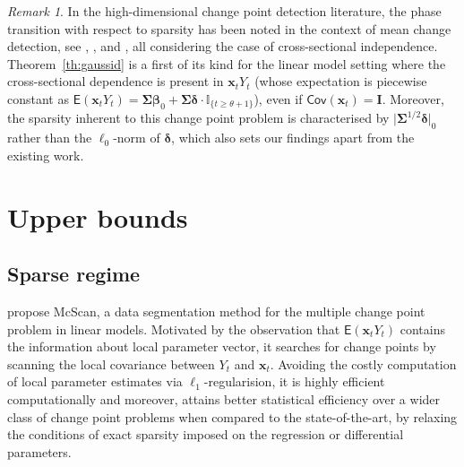 \documentclass[11pt, a4paper]{article}
\newcommand{\mbf}{\mathbf}
\newcommand{\cp}{\theta}
\newcommand{\E}[0]{\mathsf{E}}
\newcommand{\Cov}[0]{\mathsf{Cov}}
\theoremstyle{definition}
\theoremstyle{definition}
\theoremstyle{definition}
\theoremstyle{definition}
\theoremstyle{definition}
\theoremstyle{remark}
\newtheorem{rem}{Remark}[section]
\theoremstyle{definition}
\theoremstyle{definition}
\theoremstyle{definition}
\begin{document}
\begin{rem} %
In the high-dimensional change point detection literature, the phase transition with respect to sparsity has been noted in the context of mean change detection, see \cite{enikeeva2019high}, \cite{liu2021minimax}, \cite{pilliat2023optimal} and \cite{kovacs2024optimistic}, all considering the case of cross-sectional independence.
Theorem~\ref{th:gaussid} is a first of its kind for the linear model setting where the cross-sectional dependence is present in $\mbf x_t Y_t$ (whose expectation is piecewise constant as $\E(\mbf x_t Y_t) = \bm\Sigma \bm\beta_0 + \bm\Sigma \bm\delta \cdot \mathbb{I}_{\{t \ge \cp + 1\}}$), even if $\Cov(\mbf x_t) = \mbf I$.
Moreover, the sparsity inherent to this change point problem is characterised by $\vert \bm\Sigma^{1/2} \bm\delta \vert_0$ rather than the $\ell_0$-norm of $\bm\delta$, which also sets our findings apart from the existing work.
\end{rem}

\section{Upper bounds}
\label{sec:upper}


\subsection{Sparse regime}
\label{sec:sparse}

\citet{cho2024detection} propose McScan, a data segmentation method for the multiple change point problem in linear models.
Motivated by the observation that $\E(\mbf x_tY_t)$ contains the information about local parameter vector, it searches for change points by scanning the local covariance between $Y_t$ and $\mbf x_t$.
Avoiding the costly computation of local parameter estimates via $\ell_1$-regularision, it is highly efficient computationally and moreover, attains better statistical efficiency over a wider class of change point problems when compared to the state-of-the-art, by relaxing the conditions of exact sparsity imposed on the regression or differential parameters. 
\end{document}

